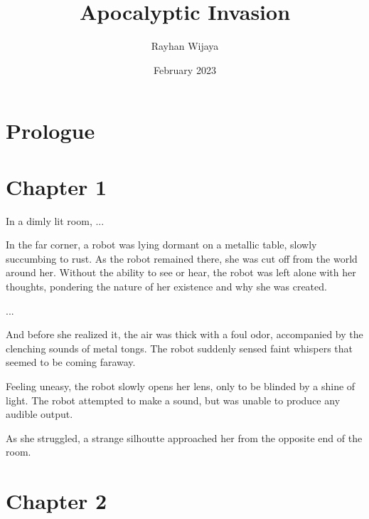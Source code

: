 \documentclass[12pt]{report}
\title{Apocalyptic Invasion}
\author{Rayhan Wijaya}
\date{February 2023}
\begin{document}
\maketitle

\section*{Prologue}

\section*{Chapter 1}

In a dimly lit room, ...

In the far corner, a robot was lying dormant on a metallic table, slowly
succumbing to rust. As the robot remained there, she was cut off from the world
around her. Without the ability to see or hear, the robot was left alone with
her thoughts, pondering the nature of her existence and why she was created.

...

And before she realized it, the air was thick with a foul odor, accompanied by
the clenching sounds of metal tongs. The robot suddenly sensed faint whispers
that seemed to be coming faraway.

Feeling uneasy, the robot slowly opens her lens, only to be blinded by a shine
of light. The robot attempted to make a sound, but was unable to produce any
audible output.

As she struggled, a strange silhoutte approached her from the opposite end of
the room.

\section*{Chapter 2}
\end{document}
